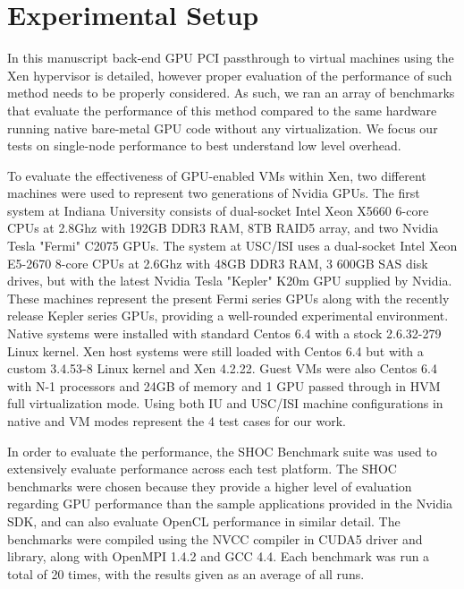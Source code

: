 \section{Experimental Setup} 


In this manuscript back-end GPU PCI passthrough to virtual machines using the Xen hypervisor is detailed, however proper evaluation of the performance of such method needs to be properly considered. As such, we ran an array of benchmarks that evaluate the performance of this method compared to the same hardware running native bare-metal GPU code without any virtualization. We focus our tests on single-node performance to best understand low level overhead.


To evaluate the effectiveness of GPU-enabled VMs within Xen, two different machines were used to represent two generations of Nvidia GPUs. The first system at Indiana University consists of dual-socket Intel Xeon X5660 6-core CPUs at 2.8Ghz with 192GB DDR3 RAM, 8TB RAID5 array, and two Nvidia Tesla "Fermi" C2075 GPUs. The system at USC/ISI uses a dual-socket Intel Xeon E5-2670 8-core CPUs at 2.6Ghz with 48GB DDR3 RAM, 3 600GB SAS disk drives, but with the latest Nvidia Tesla  "Kepler" K20m GPU supplied by Nvidia.  These machines represent the present Fermi series GPUs along with the recently release Kepler series GPUs, providing a well-rounded experimental environment. Native systems were installed with standard Centos 6.4 with a stock 2.6.32-279 Linux kernel. Xen host systems were still loaded with Centos 6.4 but with a custom 3.4.53-8 Linux kernel and Xen 4.2.22.  Guest VMs were also Centos 6.4 with N-1 processors and 24GB of memory and 1 GPU passed through in HVM full virtualization mode. Using both IU and USC/ISI machine configurations in native and VM modes represent the 4 test cases for our work.


In order to evaluate the performance, the SHOC Benchmark suite \cite{danalis2010scalable} was used to extensively evaluate performance across each test platform. The SHOC benchmarks were chosen because they provide a higher level of evaluation regarding GPU performance than the sample applications provided in the Nvidia SDK, and can also evaluate OpenCL performance in similar detail. The benchmarks were compiled using the NVCC compiler in CUDA5 driver and library, along with OpenMPI 1.4.2 and GCC 4.4. Each benchmark was run a total of 20 times, with the results given as an average of all runs. 


